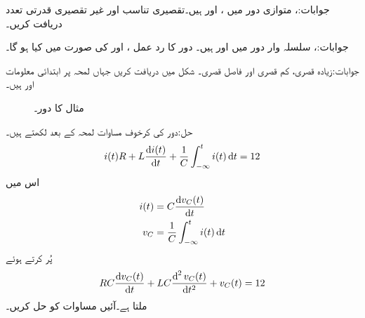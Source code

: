 جوابات:، 
متوازی  دور میں ،  اور  ہیں۔تقصیری تناسب اور غیر تقصیری قدرتی تعدد دریافت کریں۔

جوابات:، 
سلسلہ وار  دور میں  اور  ہیں۔ دور کا رد عمل ،  اور  کی صورت میں کیا ہو گا۔

جوابات:زیادہ قصری، کم قصری اور فاصل قصری۔
شکل  میں  دریافت کریں جہاں لمحہ  پر ابتدائی معلومات  اور  ہیں۔
\begin{figure}
\centering
{}
\caption{مثال  کا دور۔}
\label{شکل_عارضی_مستطیل_دباو_الف}
\end{figure}

حل:دور کی کرخوف مساوات لمحہ  کے بعد لکھتے ہیں۔
\begin{align}\label{مساوات_عارضی_مثال_سلسلہ_وار_الف}
i(t)R+L\frac{\dif i(t)}{\dif t}+\frac{1}{C}\int_{-\infty}^t i(t) \dif t=12
\end{align} 
اس میں 
\begin{align*}
i(t)&=C\frac{\dif v_C(t)}{\dif t}\\
v_C&=\frac{1}{C}\int_{-\infty}^{t} i(t)\dif t
\end{align*}
پُر کرتے ہوئے
\begin{align}\label{مساوات_عارضی_مثال_سلسلہ_وار_ب}
RC \frac{\dif v_C(t)}{\dif t}+LC \frac{\dif^{\,2} v_C(t)}{\dif t^2}+v_C(t)=12
\end{align}
ملتا ہے۔آئیں مساوات  کو حل کریں۔

